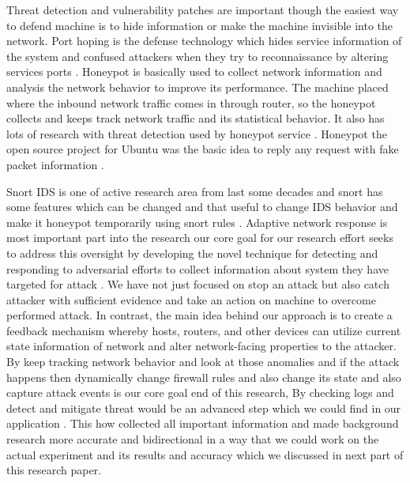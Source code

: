 Threat detection and vulnerability patches are important though the easiest way to defend machine is to hide information or make the machine invisible into the network. Port hoping is the defense technology which hides service information of the system and confused attackers when they try to reconnaissance by altering services ports \cite{honeypotCatchInsider}. Honeypot is basically used to collect network information and analysis the network behavior to improve its performance. The machine placed where the inbound network traffic comes in through router, so the honeypot collects and keeps track network traffic and its statistical behavior. It also has lots of research with threat detection used by honeypot service \cite{portHopping}. Honeypot the open source project for Ubuntu was the basic idea to reply any request with fake packet information \cite{misc:honeypot}. 


Snort IDS is one of active research area from last some decades and snort has some features which can be changed and that useful to change IDS behavior and make it honeypot temporarily using snort rules \cite{signatureBaseIDSusingSnort}. Adaptive network response is most important part into the research our core goal for our research effort seeks to address this oversight by developing the novel technique for detecting and responding to adversarial efforts to collect information about system they have targeted for attack \cite{aDeclarativeStateful}. We have not just focused on stop an attack but also catch attacker with sufficient evidence and take an action on machine to overcome performed attack. In contrast, the main idea behind our approach is to create a feedback mechanism whereby hosts, routers, and other devices can utilize current state information of network and alter network-facing properties to the attacker. By keep tracking network behavior and look at those anomalies and if the attack happens then dynamically change firewall rules and also change its state and also capture attack events is our core goal end of this research, By checking logs and detect and mitigate threat would be an advanced step which we could find in our application \cite{dynamicRuleCreation}. This how collected all important information and made background research more accurate and bidirectional in a way that we could work on the actual experiment and its results and accuracy which we discussed in next part of this research paper.
